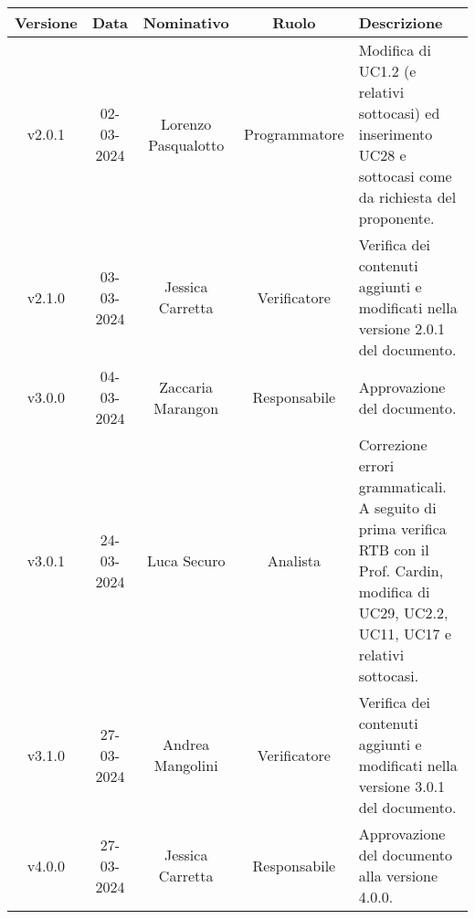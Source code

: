     \begin{table}[H]
        \centering
        \renewcommand\tabularxcolumn[1]{m{#1}} %
        \renewcommand{\arraystretch}{1.5}
        \begin{tabularx}{0.98\textwidth}
            {c|c|c|c|>{\centering\arraybackslash}X}
            \rowcolor{black}
            \textbf{\color{white} Versione} & \textbf{\color{white} Data} & \textbf{\color{white} Nominativo} & \textbf{\color{white} Ruolo} & \textbf{\color{white} Descrizione} \\ 
            \hline
            v2.0.1 & 02-03-2024 & Lorenzo Pasqualotto & Programmatore & Modifica di UC1.2 (e relativi sottocasi) ed inserimento UC28 e sottocasi come da richiesta del proponente.\\
            v2.1.0 & 03-03-2024 & Jessica Carretta & Verificatore & Verifica dei contenuti aggiunti e modificati nella versione 2.0.1 del documento.\\
            v3.0.0 & 04-03-2024 & Zaccaria Marangon & Responsabile & Approvazione del documento.\\
            v3.0.1 & 24-03-2024 & Luca Securo & Analista & Correzione errori grammaticali. A seguito di prima verifica RTB con il Prof. Cardin, modifica di UC29, UC2.2, UC11, UC17 e relativi sottocasi.\\
            v3.1.0 & 27-03-2024 & Andrea Mangolini & Verificatore & Verifica dei contenuti aggiunti e modificati nella versione 3.0.1 del documento.\\
            v4.0.0 & 27-03-2024 & Jessica Carretta & Responsabile & Approvazione del documento alla versione 4.0.0.\\
            \hline
        \end{tabularx}
    \end{table}